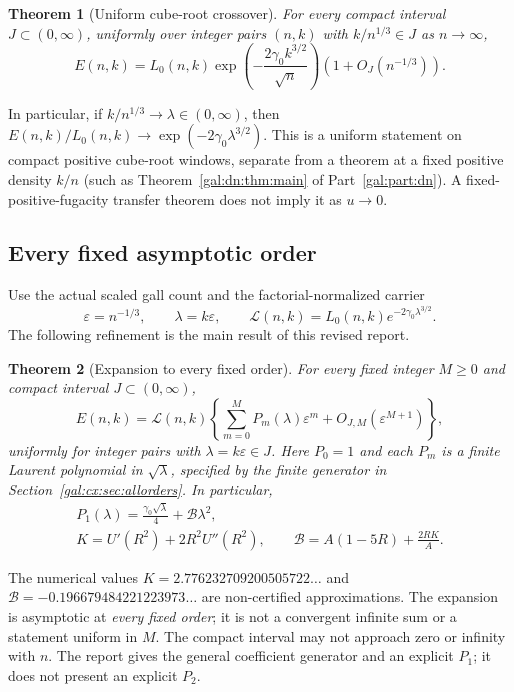 \documentclass[11pt,letterpaper]{article}
\numberwithin{equation}{section}
\newtheorem{theorem}{Theorem}[section]
\theoremstyle{definition}\newtheorem{definition}[theorem]{Definition}
\theoremstyle{remark}\newtheorem{remark}[theorem]{Remark}
\newcommand{\eps}{\varepsilon}
\newcommand{\Lfix}{L_0(n,k)}
\begin{document}
\begin{theorem}[Uniform cube-root crossover]\label{gal:cx:thm:main}
For every compact interval $J\subset(0,\infty)$, uniformly over integer pairs $(n,k)$ with $k/n^{1/3}\in J$ as $n\to\infty$,
\begin{equation}\label{gal:cx:eq:main}
E(n,k)=\Lfix\exp\!\left(-\frac{2\gamma_0 k^{3/2}}{\sqrt n}\right)
\left(1+O_J(n^{-1/3})\right).
\end{equation}
\end{theorem}
In particular, if $k/n^{1/3}\to\lambda\in(0,\infty)$, then
$E(n,k)/\Lfix\to\exp(-2\gamma_0\lambda^{3/2})$.
This is a uniform statement on compact positive cube-root windows, separate from a theorem at a fixed positive density $k/n$ (such as Theorem~\ref{gal:dn:thm:main} of Part~\ref{gal:part:dn}). A fixed-positive-fugacity transfer theorem does not imply it as $u\to0$.

\subsection{Every fixed asymptotic order}
Use the actual scaled gall count and the factorial-normalized carrier
\begin{equation}\label{gal:cx:eq:carrier}
\eps=n^{-1/3},\qquad \lambda=k\eps,\qquad
\mathcal L(n,k)=L_0(n,k)e^{-2\gamma_0\lambda^{3/2}}.
\end{equation}
The following refinement is the main result of this revised report.
\begin{theorem}[Expansion to every fixed order]\label{gal:cx:thm:allorders}
For every fixed integer $M\ge0$ and compact interval $J\subset(0,\infty)$,
\begin{equation}\label{gal:cx:eq:allorders}
E(n,k)=\mathcal L(n,k)
\left\{\sum_{m=0}^{M}P_m(\lambda)\eps^m+
O_{J,M}(\eps^{M+1})\right\},
\end{equation}
uniformly for integer pairs with $\lambda=k\eps\in J$. Here $P_0=1$ and each $P_m$ is a finite Laurent polynomial in $\sqrt\lambda$, specified by the finite generator in Section~\ref{gal:cx:sec:allorders}. In particular,
\begin{equation}\label{gal:cx:eq:P1}
\begin{gathered}
P_1(\lambda)=\frac{\gamma_0\sqrt\lambda}{4}+\mathcal B\lambda^2,\\
K=U'(R^2)+2R^2U''(R^2),\qquad
\mathcal B=A(1-5R)+\frac{2RK}{A}.
\end{gathered}
\end{equation}
\end{theorem}
The numerical values $K=2.776232709200505722\ldots$ and
$\mathcal B=-0.196679484221223973\ldots$ are non-certified approximations.
The expansion is asymptotic at \emph{every fixed order}; it is not a convergent infinite sum or a statement uniform in $M$. The compact interval may not approach zero or infinity with $n$. The report gives the general coefficient generator and an explicit $P_1$; it does not present an explicit $P_2$.
\end{document}
